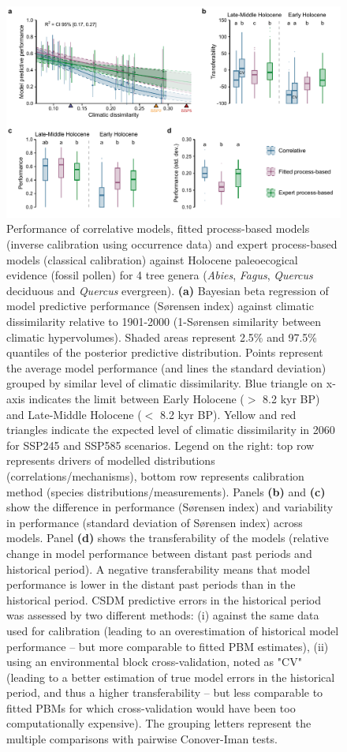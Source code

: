 \documentclass[9pt,twocolumn,twoside]{pnas-new}
\begin{document}
\begin{figure}[tbhp]
\centering
\includegraphics[width=17cm]{past_performance.pdf}
\caption{Performance of correlative models, fitted process-based models (inverse calibration using occurrence data) and expert process-based models (classical calibration) against Holocene paleoecogical evidence (fossil pollen) for 4 tree genera (\emph{Abies}, \emph{Fagus}, \emph{Quercus} deciduous and \emph{Quercus} evergreen). \textbf{(a)} Bayesian beta regression of model predictive performance (Sørensen index) against climatic dissimilarity relative to 1901-2000 (1-Sørensen similarity between climatic hypervolumes). Shaded areas represent 2.5\% and 97.5\% quantiles of the posterior predictive distribution. Points represent the average model performance (and lines the standard deviation) grouped by similar level of climatic dissimilarity. Blue triangle on x-axis indicates the limit between Early Holocene ($>$ 8.2 kyr BP) and Late-Middle Holocene ($<$ 8.2 kyr BP). Yellow and red triangles indicate the expected level of climatic dissimilarity in 2060 for SSP245 and SSP585 scenarios. Legend on the right: top row represents drivers of modelled distributions (correlations/mechanisms), bottom row represents calibration method (species distributions/measurements). Panels \textbf{(b)} and \textbf{(c)} show the difference in performance (Sørensen index) and variability in performance (standard deviation of Sørensen index) across models. Panel \textbf{(d)} shows the transferability of the models (relative change in model performance between distant past periods and historical period). A negative transferability means that model performance is lower in the distant past periods than in the historical period. CSDM predictive errors in the historical period was assessed by two different methods: (i) against the same data used for calibration (leading to an overestimation of historical model performance -- but more comparable to fitted PBM estimates), (ii) using an environmental block cross-validation, noted as "CV" (leading to a better estimation of true model errors in the historical period, and thus a higher transferability -- but less comparable to fitted PBMs for which cross-validation would have been too computationally expensive). The grouping letters represent the multiple comparisons with pairwise Conover-Iman tests.}
\label{fig:pastperformance}
\end{figure}
\end{document}
